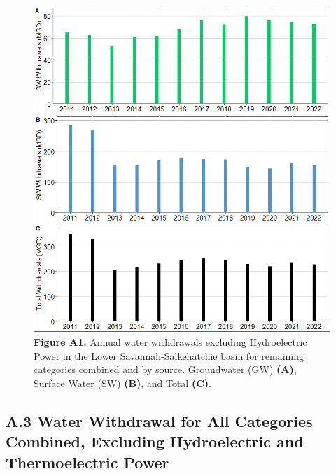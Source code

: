 \documentclass[
]{article}
\begin{document}
\begin{figure}[H]

{\centering \includegraphics{LSS_figures/trend-bar-plot-all_cat_noPH-1} 

}

\caption{\textbf{Figure A1.} Annual water withdrawals excluding Hydroelectric Power in the Lower Savannah-Salkehatchie basin for remaining categories combined and by source. Groundwater (GW) \textbf{(A)}, Surface Water (SW) \textbf{(B)}, and Total \textbf {(C)}.}\label{fig:trend-bar-plot-all_cat_noPH}
\end{figure}

\hypertarget{a.3-water-withdrawal-for-all-categories-combined-excluding-hydroelectric-and-thermoelectric-power}{%
\subsection{A.3 Water Withdrawal for All Categories Combined, Excluding
Hydroelectric and Thermoelectric
Power}\label{a.3-water-withdrawal-for-all-categories-combined-excluding-hydroelectric-and-thermoelectric-power}}
\end{document}
